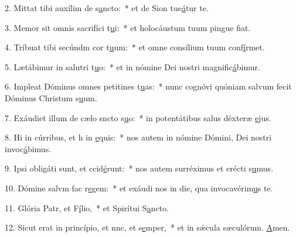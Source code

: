 2. Mittat tibi auxílim de s\uline{a}ncto:~* et de Sion tue\uline{á}tur te.\par 
3. Memor sit omnis sacrifíci t\uline{u}i:~* et holocáustum tuum pingue f\uline{i}at.\par 
4. Tríbuat tibi secúndm cor t\uline{u}um:~* et omne consílium tuum conf\uline{í}rmet.\par 
5. Lætábimur in salutri t\uline{u}o:~* et in nómine Dei nostri magnific\uline{á}bimur.\par 
6. Impleat Dóminus omnes petitines t\uline{u}as:~* nunc cognóvi quóniam salvum fecit Dóminus Christum s\uline{u}um.\par 
7. Exáudiet illum de cælo sncto s\uline{u}o:~* in potentátibus salus déxteræ \uline{e}jus.\par 
8. Hi in cúrribus, et h in \uline{e}quis:~* nos autem in nómine Dómini, Dei nostri invoc\uline{á}bimus.\par 
9. Ipsi obligáti sunt, et ccid\uline{é}runt:~* nos autem surréximus et erécti s\uline{u}mus.\par 
10. Dómine salvm fac r\uline{e}gem:~* et exáudi nos in die, qua invocavérim\uline{u}s te.\par 
11. Glória Patr, et F\uline{í}lio,~* et Spirítui S\uline{a}ncto.\par 
12. Sicut erat in princípio, et nnc, et s\uline{e}mper,~* et in sǽcula sæculórum. \uline{A}men.\par 
